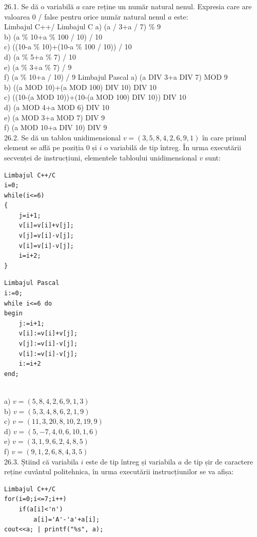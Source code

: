 {{26.1. Se dă o variabilă $a$ care reține un număr natural nenul. Expresia care are valoarea 0 / false pentru orice număr natural nenul $a$ este:
\\
Limbajul C++/ Limbajul C
a) (a / 3+a / 7) \% 9
\\
b) (a \% 10+a \% 100 / 10) / 10
\\
c) ((10-a \% 10)+(10-a \% 100 / 10)) / 10
\\
d) (a \% 5+a \% 7) / 10
\\
e) (a \% 3+a \% 7) / 9
\\
f) (a \% 10+a / 10) / 9
Limbajul Pascal
a) (a DIV 3+a DIV 7) MOD 9
\\
b) ((a MOD 10)+(a MOD 100) DIV 10) DIV 10
\\
c) ((10-(a MOD 10))+(10-(a MOD 100) DIV 10)) DIV 10
\\
d) (a MOD 4+a MOD 6) DIV 10
\\
e) (a MOD 3+a MOD 7) DIV 9
\\
f) (a MOD 10+a DIV 10) DIV 9
\\
26.2. Se dă un tablou unidimensional $v=(3,5,8,4,2,6,9,1)$ în care primul element se află pe poziția 0 și $i$ o variabilă de tip întreg. În urma executării secvenței de instrucțiuni, elementele tabloului unidimensional $v$ sunt:
\begin{verbatim}
Limbajul C++/C
i=0;
while(i<=6)
{
    j=i+1;
    v[i]=v[i]+v[j];
    v[j]=v[i]-v[j];
    v[i]=v[i]-v[j];
    i=i+2;
}
\end{verbatim}
\begin{verbatim}
Limbajul Pascal 
i:=0;
while i<=6 do
begin
    j:=i+1;
    v[i]:=v[i]+v[j]; 
    v[j]:=v[i]-v[j];
    v[i]:=v[i]-v[j];
    i:=i+2
end;
\end{verbatim}
\\
a) $v=(5,8,4,2,6,9,1,3)$
\\
b) $v=(5,3,4,8,6,2,1,9)$
\\
c) $v=(11,3,20,8,10,2,19,9)$
\\
d) $v=(5,-7,4,0,6,10,1,6)$
\\
e) $v=(3,1,9,6,2,4,8,5)$
\\
f) $v=(9,1,2,6,8,4,3,5)$
\\
26.3. Ș̦tiind că variabila $i$ este de tip întreg și variabila $a$ de tip șir de caractere reține cuvântul politehnica, în urma executării instrucțiunilor se va afișa:
\begin{verbatim}
Limbajul C++/C
for(i=0;i<=7;i++)
    if(a[i]<'n')
        a[i]='A'-'a'+a[i];
cout<<a; | printf("%s", a);
\end{verbatim}
}}
